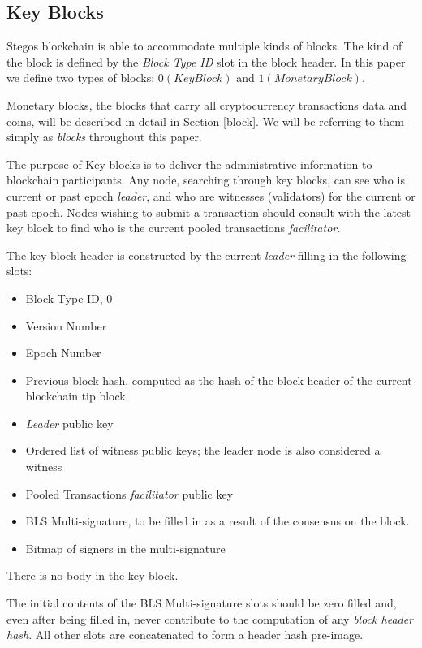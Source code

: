 \documentclass[a4paper, 10pt, conference]{ieeeconf}
\begin{document}
\subsection{Key Blocks}

Stegos blockchain is able to accommodate multiple kinds of blocks. The kind of the block is defined by the \textit{Block Type ID} slot in the block header. In this paper we define two types of blocks: $0 (KeyBlock)$ and $1 (MonetaryBlock)$.

Monetary blocks, the blocks that carry all cryptocurrency transactions data and coins, will be described in detail in Section \ref{block}. We will be referring to them simply as \textit{blocks} throughout this paper. 

The purpose of Key blocks is to deliver the administrative information to blockchain participants. Any node, searching through key blocks, can see who is current or past epoch \textit{leader}, and who are witnesses (validators) for the current or past epoch. Nodes wishing to submit a transaction should consult with the latest key block to find who is the current pooled transactions \textit{facilitator}.

The key block header is constructed by the current \textit{leader} filling in the following slots:

\begin{itemize}
	\item {Block Type ID, 0}
	\item {Version Number}
	\item {Epoch Number}
	\item {Previous block hash, computed as the hash of the block header of the current blockchain tip block}
	\item {\textit{Leader} public key}
	\item {Ordered list of witness public keys; the leader node is also considered a witness}
	\item {Pooled Transactions \textit{facilitator} public key}
	\item {BLS Multi-signature, to be filled in as a result of the consensus on the block.}
	\item {Bitmap of signers in the multi-signature}
\end{itemize}

There is no body in the key block.

The initial contents of the BLS Multi-signature slots should be zero filled and, even after being filled in, never contribute to the computation of any \textit{block header hash}. All other slots are concatenated to form a header hash pre-image.
\end{document}
